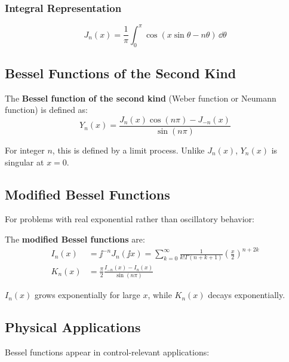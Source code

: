 \subsubsection{Integral Representation}
\begin{equation}
J_n(x) = \frac{1}{\pi}\int_0^\pi \cos(x\sin\theta - n\theta) \, \dd\theta
\end{equation}

\subsection{Bessel Functions of the Second Kind}

The \textbf{Bessel function of the second kind} (Weber function or Neumann function) is defined as:
\begin{equation}
Y_n(x) = \frac{J_n(x)\cos(n\pi) - J_{-n}(x)}{\sin(n\pi)}
\end{equation}

For integer $n$, this is defined by a limit process. Unlike $J_n(x)$, $Y_n(x)$ is singular at $x = 0$.

\subsection{Modified Bessel Functions}

For problems with real exponential rather than oscillatory behavior:

\begin{definitionbox}[title=Definition 10.9: Modified Bessel Functions]
The \textbf{modified Bessel functions} are:
\begin{align}
I_n(x) &= \jj^{-n}J_n(\jj x) = \sum_{k=0}^{\infty} \frac{1}{k!\Gamma(n+k+1)}\left(\frac{x}{2}\right)^{n+2k} \\
K_n(x) &= \frac{\pi}{2}\frac{I_{-n}(x) - I_n(x)}{\sin(n\pi)}
\end{align}
\end{definitionbox}

$I_n(x)$ grows exponentially for large $x$, while $K_n(x)$ decays exponentially.

\subsection{Physical Applications}

Bessel functions appear in control-relevant applications:

